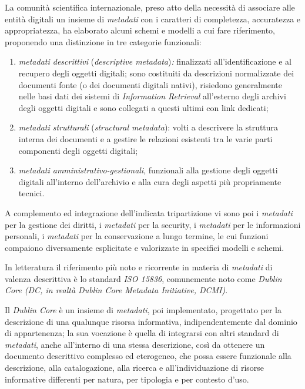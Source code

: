 {La comunità scientifica internazionale, preso atto della necessità di
associare alle entità digitali un insieme di \emph{metadati} con i
caratteri di completezza, accuratezza e appropriatezza, ha elaborato
alcuni schemi e modelli a cui fare riferimento, proponendo una
distinzione in tre categorie funzionali:

\begin{enumerate}
\def\labelenumi{\arabic{enumi}.}
\item
  \emph{metadati descrittivi} (\emph{descriptive metadata})\emph{:}
  finalizzati all'identificazione e al recupero degli oggetti digitali;
  sono costituiti da descrizioni normalizzate dei documenti fonte (o dei
  documenti digitali nativi), risiedono generalmente nelle basi dati dei
  sistemi di \emph{Information Retrieval} all'esterno degli archivi
  degli oggetti digitali e sono collegati a questi ultimi con link
  dedicati;
\item
  \emph{metadati strutturali} (\emph{structural metadata}): volti a
  descrivere la struttura interna dei documenti e a gestire le relazioni
  esistenti tra le varie parti componenti degli oggetti digitali;
\item
  \emph{metadati amministrativo-gestionali}, funzionali alla gestione
  degli oggetti digitali all'interno dell'archivio e alla cura degli
  aspetti più propriamente tecnici.
\end{enumerate}

A complemento ed integrazione dell'indicata tripartizione vi sono poi i
\emph{metadati} per la gestione dei diritti, i \emph{metadati} per la
security, i \emph{metadati} per le informazioni personali, i
\emph{metadati} per la conservazione a lungo termine, le cui funzioni
compaiono diversamente esplicitate e valorizzate in specifici modelli e
schemi.

In letteratura il riferimento più noto e ricorrente in materia di
\emph{metadati} di valenza descrittiva è lo standard \emph{ISO 15836},
comunemente noto come \emph{Dublin Core (DC, in realtà Dublin Core
Metadata Initiative, DCMI)}.

Il \emph{Dublin Core} è un insieme di \emph{metadati}, poi implementato,
progettato per la descrizione di una qualunque risorsa informativa,
indipendentemente dal dominio di appartenenza; la sua vocazione è quella
di integrarsi con altri standard di \emph{metadati}, anche all'interno
di una stessa descrizione, così da ottenere un documento descrittivo
complesso ed eterogeneo, che possa essere funzionale alla descrizione,
alla catalogazione, alla ricerca e all'individuazione di risorse
informative differenti per natura, per tipologia e per contesto d'uso.

}
